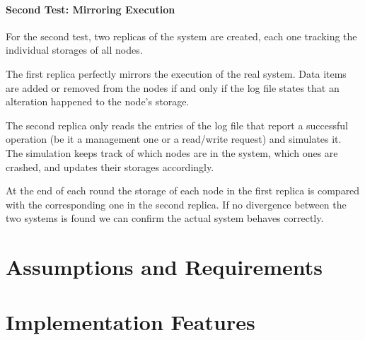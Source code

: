 \documentclass{article}
\begin{document}
\paragraph {Second Test: Mirroring Execution}
For the second test, two replicas of the system are created, each one tracking the individual storages of all nodes.

The first replica perfectly mirrors the execution of the real system. Data items are added or removed from the nodes if and only if the log file states that an alteration happened to the node's storage.

The second replica only reads the entries of the log file that report a successful operation (be it a management one or a read/write request) and simulates it.\\
The simulation keeps track of which nodes are in the system, which ones are crashed, and updates their storages accordingly.

At the end of each round the storage of each node in the first replica is compared with the corresponding one in the second replica. If no divergence between the two systems is found we can confirm the actual system behaves correctly.

\section{Assumptions and Requirements}

\section{Implementation Features}

\end{document}
